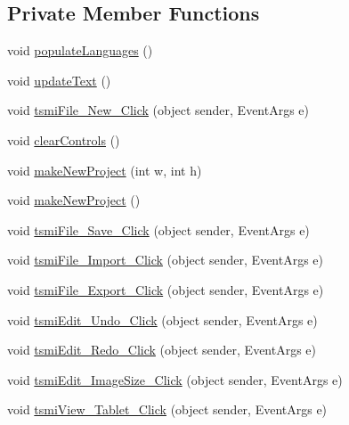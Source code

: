\subsection*{Private Member Functions}
\begin{DoxyCompactItemize}
\item 
void \mbox{\hyperlink{class_paint___program_1_1_form1_ad5dbb25f15e04e473f655ef8c5bd802b}{populate\+Languages}} ()
\item 
void \mbox{\hyperlink{class_paint___program_1_1_form1_ae9b214b2328b056c5ef7abd8f5c23cac}{update\+Text}} ()
\item 
void \mbox{\hyperlink{class_paint___program_1_1_form1_a65946e8eafe9f2781c86e2f0e9978884}{tsmi\+File\+\_\+\+New\+\_\+\+Click}} (object sender, Event\+Args e)
\item 
void \mbox{\hyperlink{class_paint___program_1_1_form1_a95401dd65c21b5064231e937fa2f1c76}{clear\+Controls}} ()
\item 
void \mbox{\hyperlink{class_paint___program_1_1_form1_a310f0830882ebdd322bf0d7759f96ff5}{make\+New\+Project}} (int w, int h)
\item 
void \mbox{\hyperlink{class_paint___program_1_1_form1_a2f74b219f8f7f47c8be05b2667ab69a2}{make\+New\+Project}} ()
\item 
void \mbox{\hyperlink{class_paint___program_1_1_form1_ae89dccd20de8980d209287a921919486}{tsmi\+File\+\_\+\+Save\+\_\+\+Click}} (object sender, Event\+Args e)
\item 
void \mbox{\hyperlink{class_paint___program_1_1_form1_a33c80b08bee3a3ac7412c7908f82ada0}{tsmi\+File\+\_\+\+Import\+\_\+\+Click}} (object sender, Event\+Args e)
\item 
void \mbox{\hyperlink{class_paint___program_1_1_form1_a7707f4678cdf07118d10c6a37ffbb44b}{tsmi\+File\+\_\+\+Export\+\_\+\+Click}} (object sender, Event\+Args e)
\item 
void \mbox{\hyperlink{class_paint___program_1_1_form1_a9b144805b25922b85f0573864496118a}{tsmi\+Edit\+\_\+\+Undo\+\_\+\+Click}} (object sender, Event\+Args e)
\item 
void \mbox{\hyperlink{class_paint___program_1_1_form1_a1580fac01b903f3eed54cc472422d9e4}{tsmi\+Edit\+\_\+\+Redo\+\_\+\+Click}} (object sender, Event\+Args e)
\item 
void \mbox{\hyperlink{class_paint___program_1_1_form1_a2297d59ddc751197272087975492e20b}{tsmi\+Edit\+\_\+\+Image\+Size\+\_\+\+Click}} (object sender, Event\+Args e)
\item 
void \mbox{\hyperlink{class_paint___program_1_1_form1_afe69c8230644231665ab736aa37511bd}{tsmi\+View\+\_\+\+Tablet\+\_\+\+Click}} (object sender, Event\+Args e)

\end{DoxyCompactItemize}
